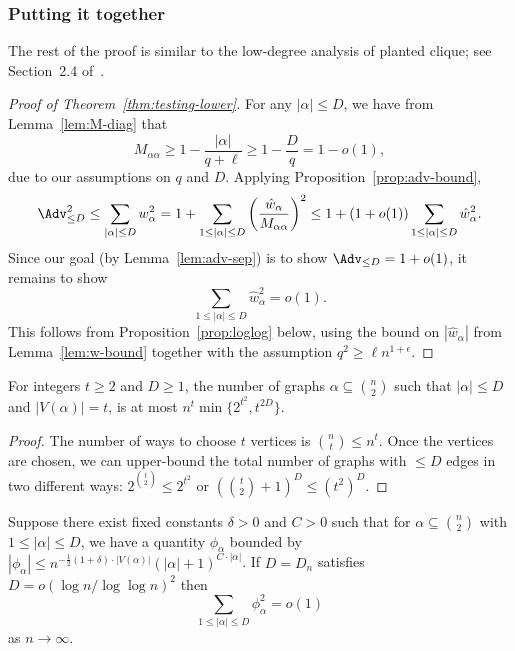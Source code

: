 \documentclass{article}
\begin{document}
\subsubsection{Putting it together}

The rest of the proof is similar to the low-degree analysis of planted clique; see Section~2.4 of~\cite{hopkins-thesis}.


\begin{proof}[Proof of Theorem~\ref{thm:testing-lower}]

For any $|\alpha| \le D$, we have from Lemma~\ref{lem:M-diag} that
\[ M_{\alpha\alpha} \ge 1 - \frac{|\alpha|}{q+\ell} \ge 1 - \frac{D}{q} = 1-o(1), \]
due to our assumptions on $q$ and $D$. Applying Proposition~\ref{prop:adv-bound},
\[ \Adv_{\le D}^2 \le \sum_{|\alpha| \le D} w_\alpha^2 = 1 + \sum_{1 \le |\alpha| \le D} \left(\frac{\hat w_\alpha}{M_{\alpha\alpha}}\right)^2 \le 1 + (1+o(1)) \sum_{1 \le |\alpha| \le D} \hat w_\alpha^2. \]
Since our goal (by Lemma~\ref{lem:adv-sep}) is to show $\Adv_{\le D} = 1+o(1)$, it remains to show
\[ \sum_{1 \le |\alpha| \le D} \hat w_\alpha^2 = o(1). \]
This follows from Proposition~\ref{prop:loglog} below, using the bound on $|\hat w_\alpha|$ from Lemma~\ref{lem:w-bound} together with the assumption $q^2 \ge \ell n^{1+\epsilon}$.
\end{proof}

\begin{lemma}\label{lem:count-graphs}
For integers $t \ge 2$ and $D \ge 1$, the number of graphs $\alpha \subseteq \binom{n}{2}$ such that $|\alpha| \le D$ and $|V(\alpha)| = t$, is at most $n^t \min\{2^{t^2}, t^{2D}\}$.
\end{lemma}

\begin{proof}
The number of ways to choose $t$ vertices is $\binom{n}{t} \le n^t$. Once the vertices are chosen, we can upper-bound the total number of graphs with $\le D$ edges in two different ways: $2^{\binom{t}{2}} \le 2^{t^2}$ or $\left(\binom{t}{2}+1\right)^D \le (t^2)^D$.
\end{proof}


\begin{proposition}\label{prop:loglog}
Suppose there exist fixed constants $\delta > 0$ and $C > 0$ such that for $\alpha \subseteq \binom{n}{2}$ with $1 \le |\alpha| \le D$, we have a quantity $\phi_\alpha$ bounded by $|\phi_\alpha| \le n^{-\frac{1}{2}(1+\delta) \cdot |V(\alpha)|} (|\alpha|+1)^{C \cdot |\alpha|}$. If $D = D_n$ satisfies $D = o(\log n/\log \log n)^2$ then
\[ \sum_{1 \le |\alpha| \le D} \phi_\alpha^2 = o(1) \]
as $n \to \infty$.
\end{proposition}
\end{document}
